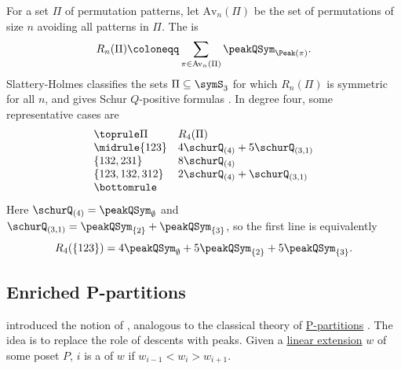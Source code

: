 \begin{example*}
For a set $\Pi$ of permutation patterns, let $\mathrm{Av}_n(\Pi)$ be the
set of permutations of size $n$ avoiding all patterns in $\Pi$.  The
 is
\[
R_n(\Pi)\coloneqq
  \sum_{\pi\in\mathrm{Av}_n(\Pi)} \peakQSym_{\Peak(\pi)}.
\]
Slattery-Holmes classifies the sets $\Pi\subseteq\symS_3$ for which
$R_n(\Pi)$ is symmetric for all $n$, and gives Schur $Q$-positive formulas
\cite[Thm.~1.1]{SlatteryHolmes2025x}.  In degree four, some representative
cases are
\[
\begin{array}{ll}
\toprule
\Pi & R_4(\Pi) \\
\midrule
\{123\}
  & 4\schurQ_{(4)} + 5\schurQ_{(3,1)} \\
\{132,231\}
  & 8\schurQ_{(4)} \\
\{123,132,312\}
  & 2\schurQ_{(4)} + \schurQ_{(3,1)} \\
\bottomrule
\end{array}
\]
Here $\schurQ_{(4)}=\peakQSym_{\emptyset}$ and
$\schurQ_{(3,1)}=\peakQSym_{\{2\}}+\peakQSym_{\{3\}}$, so the first line is
equivalently
\[
R_4(\{123\})
  =4\peakQSym_{\emptyset}
   +5\peakQSym_{\{2\}}
   +5\peakQSym_{\{3\}}.
\]
\end{example*}

\subsection[enrichedPPartitions]{Enriched P-partitions}

 introduced the notion of ,
analogous to the classical theory of \hyperref[pPartition]{P-partitions} \cite{Stembridge1997}.
The idea is to replace the role of descents with peaks.
Given a \hyperref[linearExtension]{linear extension} $w$ of some poset $P$,
$i$ is a  of $w$ if $w_{i-1} \lt w_i \gt w_{i+1}$.
